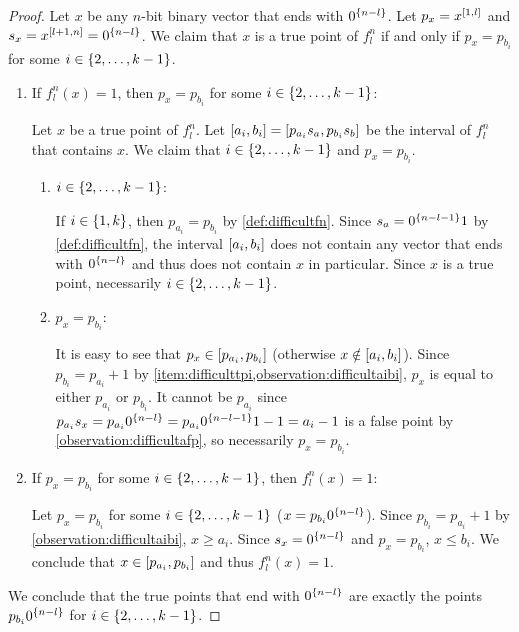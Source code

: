 \begin{proof}
Let $x$ be any $n$-bit binary vector
that ends with $0^{\{n-l\}}$.
Let $p_x = x^{[1, l]}$
and $s_x = x^{[l+1, n]} = 0^{\{n-l\}}$.
We claim that $x$ is a true point of $f_l^n$
if and only if
$p_x = p_{b_i}$ for some $i \in \{2, \ldots, k-1\}$.

\begin{enumerate}
\item If $f_l^n(x) = 1$,
then $p_x = p_{b_i}$
for some $i \in \{2, \ldots, k-1\}$:

Let $x$ be a true point of $f_l^n$.
Let $[a_i, b_i]
= [p_{a_i} s_a, p_{b_i} s_b]$
be the interval of $f_l^n$ that contains $x$.
We claim that $i \in \{2, \ldots, k-1\}$
and $p_x = p_{b_i}$.

\begin{enumerate}
\item $i \in \{2, \ldots, k-1\}$:
\label{item:difficulttpi}

If $i \in \{1, k\}$,
then $p_{a_i} = p_{b_i}$ by \cref{def:difficultfn}.
Since $s_a = 0^{\{n-l-1\}} 1$
by \cref{def:difficultfn},
the interval $[a_i, b_i]$
does not contain any vector
that ends with $0^{\{n-l\}}$
and thus does not contain $x$ in particular.
Since $x$ is a true point,
necessarily $i \in \{2, \ldots, k-1\}$.

\item $p_x = p_{b_i}$:

It is easy to see that
$p_x \in [p_{a_i}, p_{b_i}]$
(otherwise $x \notin [a_i, b_i]$).
Since $p_{b_i} = p_{a_i} + 1$
by \cref{item:difficulttpi,observation:difficultaibi},
$p_x$ is equal to either $p_{a_i}$ or $p_{b_i}$.
It cannot be $p_{a_i}$
since $p_{a_i} s_x
= p_{a_i} 0^{\{n-l\}}
= p_{a_i} 0^{\{n-l-1\}} 1 - 1
= a_i - 1$
is a false point
by \cref{observation:difficultafp},
so necessarily $p_x = p_{b_i}$.
\end{enumerate}

\item If $p_x = p_{b_i}$
for some $i \in \{2, \ldots, k-1\}$,
then $f_l^n(x) = 1$:

Let $p_x = p_{b_i}$
for some $i \in \{2, \ldots, k-1\}$
($x = p_{b_i} 0^{\{n-l\}}$).
Since $p_{b_i} = p_{a_i} + 1$
by \cref{observation:difficultaibi},
$x \geq a_i$.
Since $s_x = 0^{\{n-l\}}$ and $p_x = p_{b_i}$,
$x \leq b_i$.
We conclude that $x \in [p_{a_i}, p_{b_i}]$
and thus $f_l^n(x) = 1$.
\end{enumerate}

We conclude that the true points that end with $0^{\{n-l\}}$
are exactly the points $p_{b_i} 0^{\{n-l\}}$
for $i \in \{2, \ldots, k-1\}$.
\end{proof}

